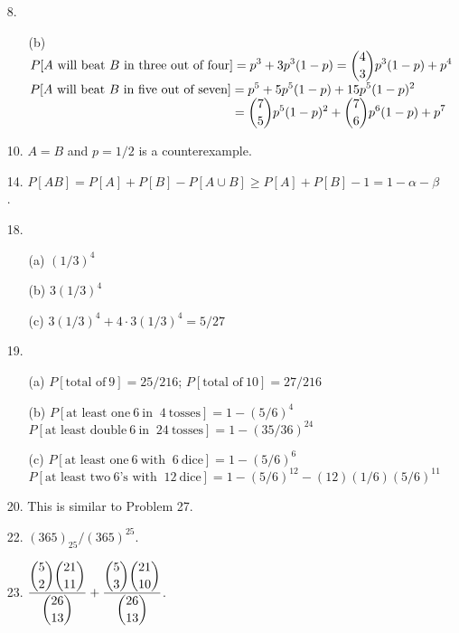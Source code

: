 \begin{enumerate}
	\item[8.] \begin{enumerate}
		\item[(b)] $\displaystyle P[A\ \text{will beat}\ B\ \text{in three out of four}] = p^3+3p^3(1-p) = {4\choose 3}p^3(1-p) + p^4$ \\
		$\displaystyle P[A\ \text{will beat}\ B\ \text{in five out of seven}] = p^5 + 5p^5(1-p) + 15p^5(1-p)^2$ \\
		$\dsp \phantom{P[A\ \text{will beat}\ B\ \text{in five out of seven}]} = {7\choose 5}p^5(1-p)^2 + {7\choose 6}p^6(1-p) + p^7$
	\end{enumerate}

	\item[10.] $A = B$ and $p=1/2$ is a counterexample.
	
	\item[14.] $P[AB] = P[A]+P[B]-P[A\cup B] \ge P[A] +P[B]-1  = 1-\alpha - \beta$.
	
	\item[18.] \begin{enumerate}
		\item[(a)] $(1/3)^4$
		\item[(b)] $3(1/3)^4$
		\item[(c)] $3(1/3)^4 + 4\cdot 3(1/3)^4 = 5/27$
	\end{enumerate}

	\item[19.]\begin{enumerate}
		\item[(a)] $P[\text{total of}\ 9] = 25/216$; $P[\text{total of}\ 10] = 27/216$
		\item[(b)] $P[\text{at least one}\ 6\ \text{in }\ 4\ \text{tosses}] = 1- (5/6)^4$\\
				$P[\text{at least double}\ 6\ \text{in }\ 24\ \text{tosses}] = 1- (35/36)^{24}$
		\item[(c)] $P[\text{at least one}\ 6\ \text{with }\ 6\ \text{dice}] = 1- (5/6)^6$\\
		$P[\text{at least two}\ 6\text{'s with }\ 12\ \text{dice}] = 1- (5/6)^{12} - (12)(1/6)(5/6)^{11}$
	\end{enumerate}

	\newpage
	\item[20.] This is similar to Problem 27.
	
	\item[22.] $(365)_{25}/(365)^{25}$.
	
	\item[23.] $\dfrac{\displaystyle {5\choose 2}{21\choose 11}}{\displaystyle {26\choose 13}} + \dfrac{\displaystyle {5\choose 3}{21\choose 10}}{\displaystyle {26\choose 13}}$.
	

\end{enumerate}
